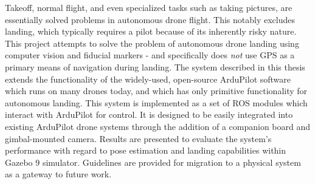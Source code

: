 Takeoff, normal flight, and even specialized tasks such as taking pictures, are essentially solved problems in autonomous drone flight. This notably excludes landing, which typically requires a pilot because of its inherently risky nature. This project attempts to solve the problem of autonomous drone landing using computer vision and fiducial markers - and specifically does \textit{not} use GPS as a primary means of navigation during landing. The system described in this thesis extends the functionality of the widely-used, open-source ArduPilot software which runs on many drones today, and which has only primitive functionality for autonomous landing. This system is implemented as a set of ROS modules which interact with ArduPilot for control. It is designed to be easily integrated into existing ArduPilot drone systems through the addition of a companion board and gimbal-mounted camera. Results are presented to evaluate the system's performance with regard to pose estimation and landing capabilities within Gazebo 9 simulator. Guidelines are provided for migration to a physical system as a gateway to future work.